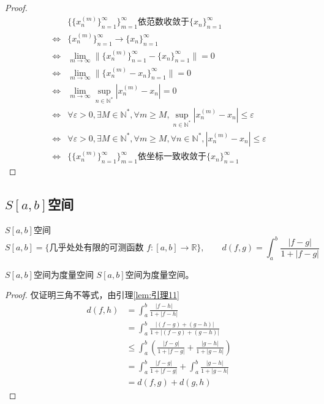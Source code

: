 \documentclass[lang = cn, scheme = chinese, thmcnt = section]{elegantbook}
\newcommand{\N}{\mathbb{N}}            %
\newcommand{\R}{\mathbb{R}}            %
\begin{document}
\begin{proof}
	\begin{align*}
		& \{\{ x_n^{(m)} \}_{n=1}^{\infty}\}_{m=1}^{\infty}\text{依范数}\text{收敛于}\{x_n\}_{n=1}^{\infty}\\
		\iff & \{ x_n^{(m)} \}_{n=1}^{\infty}\longrightarrow \{x_n\}_{n=1}^{\infty}\\
		\iff & \lim_{m\to\infty}\| \{ x_n^{(m)}\}_{n=1}^{\infty}-\{x_n \}_{n=1}^{\infty} \|=0\\
		\iff & \lim_{m\to\infty}\| \{ x_n^{(m)}-x_n \}_{n=1}^{\infty} \|
		=0\\
		\iff & \lim_{m\to\infty}\sup_{n\in\N^*}|x_n^{(m)}-x_n|=0\\
		\iff & \forall\varepsilon>0,\exists M\in\N^*,\forall m\ge M,\sup_{n\in\N^*}|x_n^{(m)}-x_n|\le\varepsilon\\
		\iff & \forall\varepsilon>0,\exists M\in\N^*,\forall m\ge M,\forall n\in\N^*,|x_n^{(m)}-x_n|\le\varepsilon\\
		\iff & \{\{ x_n^{(m)} \}_{n=1}^{\infty}\}_{m=1}^{\infty}\text{依坐标一致收敛于}\{x_n\}_{n=1}^{\infty}
	\end{align*}
\end{proof}

\subsection{$S[a,b]$空间}

\begin{definition}{$S[a,b]$空间}
	$$
	S[a,b]=\{\text{几乎处处有限的可测函数 }f:[a,b]\to\R\},\qquad  d(f,g)=\int_a^b\frac{|f-g|}{1+|f-g|}
	$$
\end{definition}

\begin{proposition}{$S[a,b]$空间为度量空间}
	$S[a,b]$空间为度量空间。
\end{proposition}

\begin{proof}
	仅证明三角不等式，由引理\ref{lem:引理11}
	\begin{align*}
		d(f,h)
		& = \int_a^b\frac{|f-h|}{1+|f-h|}\\
		& = \int_a^b\frac{|(f-g)+(g-h)|}{1+|(f-g)+(g-h)|}\\
		& \le \int_a^b \left( \frac{|f-g|}{1+|f-g|}+\frac{|g-h|}{1+|g-h|} \right)\\
		& = \int_a^b\frac{|f-g|}{1+|f-g|}+\int_a^b\frac{|g-h|}{1+|g-h|}\\
		& = d(f,g)+d(g,h)
	\end{align*}
\end{proof}
\end{document}
